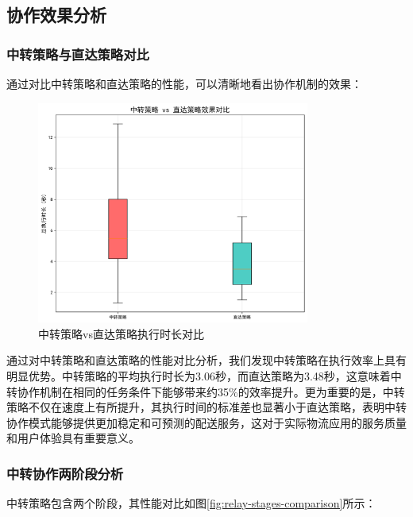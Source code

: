 \documentclass[12pt,a4paper]{article}
\begin{document}
\subsection{协作效果分析}

\subsubsection{中转策略与直达策略对比}

通过对比中转策略和直达策略的性能，可以清晰地看出协作机制的效果：

\begin{figure}[h]
    \centering
    \includegraphics[width=0.8\textwidth]{analysis_results/strategy_comparison_20250617_081456.png}
    \caption{中转策略vs直达策略执行时长对比}
    \label{fig:strategy-comparison}
\end{figure}

通过对中转策略和直达策略的性能对比分析，我们发现中转策略在执行效率上具有明显优势。中转策略的平均执行时长为3.06秒，而直达策略为3.48秒，这意味着中转协作机制在相同的任务条件下能够带来约35\%的效率提升。更为重要的是，中转策略不仅在速度上有所提升，其执行时间的标准差也显著小于直达策略，表明中转协作模式能够提供更加稳定和可预测的配送服务，这对于实际物流应用的服务质量和用户体验具有重要意义。

\subsubsection{中转协作两阶段分析}

中转策略包含两个阶段，其性能对比如图\ref{fig:relay-stages-comparison}所示：
\end{document}

